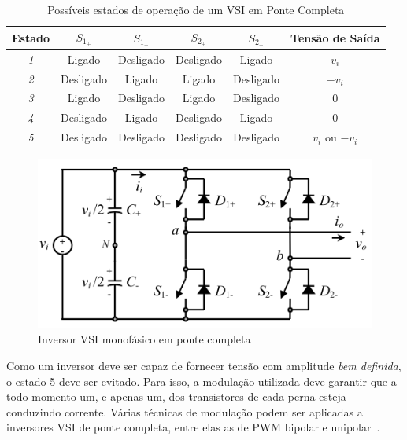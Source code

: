 \documentclass[
	12pt,				%
	openright,			%
	twoside,			%
	a4paper,			%
	english,			%
	french,				%
	spanish,			%
	brazil,				%
	]{abntex2}
\begin{document}
\begin{table}[h]%
	\centering
	\caption{Possíveis estados de operação de um VSI em Ponte Completa}
	\label{table:VSI_states}
	\begin{tabular}{|c|c|c|c|c|c|}
	\hline
	\rowcolor[HTML]{F0F0F0} 
	\textbf{Estado} & \textbf{$S_{1_+}$} & \textbf{$S_{1_-}$} & \textbf{$S_{2_+}$} & \textbf{$S_{2_-}$} & \textbf{Tensão de Saída} \\ \hline
	\textit{1}      & Ligado             & Desligado          & Desligado          & Ligado             & $v_i$                    \\ \hline
	\textit{2}      & Desligado          & Ligado             & Ligado             & Desligado          & $-v_i$                   \\ \hline
	\textit{3}      & Ligado             & Desligado          & Ligado             & Desligado          & 0                        \\ \hline
	\textit{4}      & Desligado          & Ligado             & Desligado          & Ligado             & 0                        \\ \hline
	\textit{5}      & Desligado          & Desligado          & Desligado          & Desligado          & $v_i$ ou $-v_i$          \\ \hline
	\end{tabular}
\end{table}

\begin{figure}[htbp]
	\begin{center}
		\includegraphics[width=0.65 \linewidth]{vsi_1fas}
		\caption{Inversor VSI monofásico em ponte completa~\cite{RASHID_VSI}}
		\label{fig:vsi_1fas}
	\end{center}
\end{figure}

Como um inversor deve ser capaz de fornecer tensão com amplitude \emph{bem definida}, o estado 5 deve ser evitado. Para isso, a modulação utilizada deve garantir que a todo momento um, e apenas um, dos transistores de cada perna esteja conduzindo corrente. Várias técnicas de modulação podem ser aplicadas a inversores VSI de ponte completa, entre elas as de PWM bipolar e unipolar~\cite{RASHID_VSI}.
\end{document}
